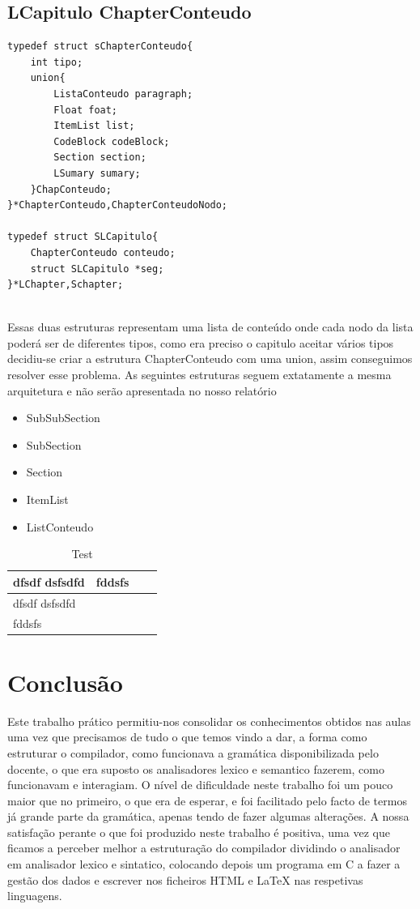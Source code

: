 \documentclass[12pt,a4paper]{report}
\begin{document}
\section{LCapitulo ChapterConteudo }
\begin{verbatim}
typedef struct sChapterConteudo{
    int tipo;
    union{
        ListaConteudo paragraph;
        Float foat;
        ItemList list;
        CodeBlock codeBlock;
        Section section;
        LSumary sumary;
    }ChapConteudo;
}*ChapterConteudo,ChapterConteudoNodo;

typedef struct SLCapitulo{
    ChapterConteudo conteudo;
    struct SLCapitulo *seg;
}*LChapter,Schapter; 
 
\end{verbatim}Essas duas estruturas representam uma lista de conteúdo onde cada nodo da lista poderá ser de diferentes tipos, como era preciso o capitulo aceitar vários tipos decidiu-se criar a estrutura ChapterConteudo com uma union, assim conseguimos resolver esse problema.       
As seguintes estruturas seguem extatamente a mesma arquitetura e não serão apresentada no nosso relatório
\begin{itemize}\item SubSubSection  \item SubSection  \item Section \item ItemList  \item ListConteudo  \end{itemize}\begin{table}\begin{center}\begin{tabular}{| l| l| l| l|}
\hline
dfsdf dsfsdfd  & 
fddsfs  
\\\hline
dfsdf dsfsdfd  
\\\hline
fddsfs  
\\\hline
\end{tabular}
\end{center}
\caption{Test }\end{table}\chapter{Conclusão}
Este trabalho prático permitiu-nos consolidar os conhecimentos obtidos nas aulas uma vez que precisamos de tudo o que temos vindo a dar, a forma como estruturar o compilador, como funcionava a gramática disponibilizada pelo docente, o que era suposto os analisadores lexico e semantico fazerem, como funcionavam e interagiam. O nível de dificuldade neste trabalho foi um pouco maior que no primeiro, o que era de esperar, e foi facilitado pelo facto de termos já grande parte da gramática, apenas tendo de fazer algumas alterações. A nossa satisfação perante o que foi produzido neste trabalho é positiva, uma vez que ficamos a perceber melhor a estruturação do compilador dividindo o analisador em analisador lexico e sintatico, colocando depois um programa em C a fazer a gestão dos dados e escrever nos ficheiros HTML e LaTeX nas respetivas linguagens. 
\end{document}
